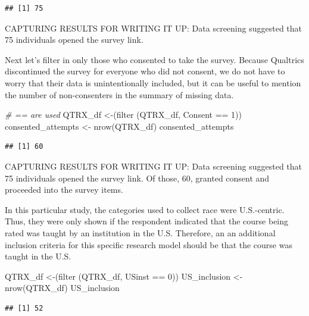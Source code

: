 \documentclass[
]{book}
\newenvironment{Shaded}{\begin{snugshade}}{\end{snugshade}}
\newcommand{\CommentTok}[1]{\textcolor[rgb]{0.56,0.35,0.01}{\textit{#1}}}
\newcommand{\DecValTok}[1]{\textcolor[rgb]{0.00,0.00,0.81}{#1}}
\newcommand{\FunctionTok}[1]{\textcolor[rgb]{0.00,0.00,0.00}{#1}}
\newcommand{\NormalTok}[1]{#1}
\newcommand{\OtherTok}[1]{\textcolor[rgb]{0.56,0.35,0.01}{#1}}
\newcommand{\SpecialCharTok}[1]{\textcolor[rgb]{0.00,0.00,0.00}{#1}}
\begin{document}
\begin{verbatim}
## [1] 75
\end{verbatim}

CAPTURING RESULTS FOR WRITING IT UP: Data screening suggested that 75 individuals opened the survey link.

Next let's filter in only those who consented to take the survey. Because Qualtrics discontinued the survey for everyone who did not consent, we do not have to worry that their data is unintentionally included, but it can be useful to mention the number of non-consenters in the summary of missing data.

\begin{Shaded}
\begin{Highlighting}[]
\CommentTok{\# == are used }
\NormalTok{QTRX\_df }\OtherTok{\textless{}{-}}\NormalTok{(}\FunctionTok{filter}\NormalTok{ (QTRX\_df, Consent }\SpecialCharTok{==} \DecValTok{1}\NormalTok{))}
\NormalTok{consented\_attempts }\OtherTok{\textless{}{-}} \FunctionTok{nrow}\NormalTok{(QTRX\_df)}
\NormalTok{consented\_attempts}
\end{Highlighting}
\end{Shaded}

\begin{verbatim}
## [1] 60
\end{verbatim}

CAPTURING RESULTS FOR WRITING IT UP: Data screening suggested that 75 individuals opened the survey link. Of those, 60, granted consent and proceeded into the survey items.

In this particular study, the categories used to collect race were U.S.-centric. Thus, they were only shown if the respondent indicated that the course being rated was taught by an institution in the U.S. Therefore, an an additional inclusion criteria for this specific research model should be that the course was taught in the U.S.

\begin{Shaded}
\begin{Highlighting}[]
\NormalTok{QTRX\_df }\OtherTok{\textless{}{-}}\NormalTok{(}\FunctionTok{filter}\NormalTok{ (QTRX\_df, USinst }\SpecialCharTok{==} \DecValTok{0}\NormalTok{))}
\NormalTok{US\_inclusion }\OtherTok{\textless{}{-}} \FunctionTok{nrow}\NormalTok{(QTRX\_df)}
\NormalTok{US\_inclusion}
\end{Highlighting}
\end{Shaded}

\begin{verbatim}
## [1] 52
\end{verbatim}
\end{document}
